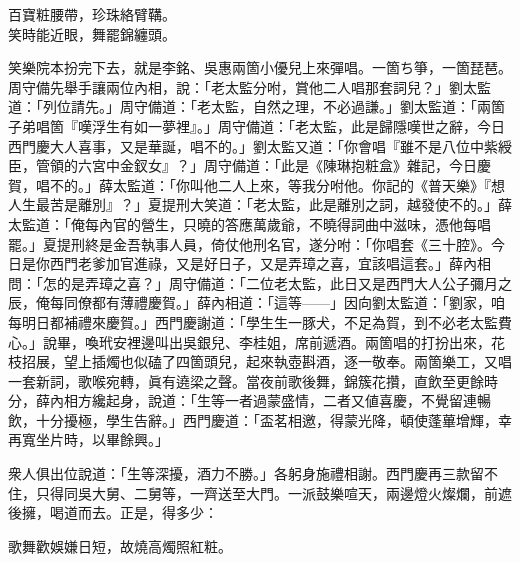 \begin{myquote}
百寶粧腰帶，珍珠絡臂鞲。\\笑時能近眼，舞罷錦纏頭。
\end{myquote}

笑樂院本扮完下去，就是李銘、吳惠兩箇小優兒上來彈唱。一箇ち箏，一箇琵琶。周守備先舉手讓兩位內相，說：「老太監分咐，賞他二人唱那套詞兒？」劉太監道：「列位請先。」周守備道：「老太監，自然之理，不必過謙。」劉太監道：「兩箇子弟唱箇『嘆浮生有如一夢裡』。」{}周守備道：「老太監，此是歸隱嘆世之辭，今日西門慶大人喜事，又是華誕，唱不的。」劉太監又道：「你會唱『雖不是八位中紫綬臣，管領的六宮中金釵女』？」{}周守備道：「此是《陳琳抱粧盒》雜記，今日慶賀，唱不的。」薛太監道：「你叫他二人上來，等我分咐他。你記的《普天樂》『想人生最苦是離別』？」{}夏提刑大笑道：「老太監，此是離別之詞，越發使不的。」薛太監道：「俺每內官的營生，只曉的答應萬歲爺，不曉得詞曲中滋味，憑他每唱罷。」{}夏提刑終是金吾執事人員，倚仗他刑名官，遂分咐：「你唱套《三十腔》。今日是你西門老爹加官進祿，又是好日子，又是弄璋之喜，宜該唱這套。」薛內相問：「怎的是弄璋之喜？」{}周守備道：「二位老太監，此日又是西門大人公子彌月之辰，俺每同僚都有薄禮慶賀。」薛內相道：「這等——」因向劉太監道：「劉家，咱每明日都補禮來慶賀。」西門慶謝道：「學生生一豚犬，不足為賀，到不必老太監費心。」說畢，喚玳安裡邊叫出吳銀兒、李桂姐，席前遞酒。兩箇唱的打扮出來，花枝招展，望上插燭也似磕了四箇頭兒，起來執壺斟酒，逐一敬奉。兩箇樂工，又唱一套新詞，歌喉宛轉，眞有遶梁之聲。當夜前歌後舞，錦簇花攢，直飲至更餘時分，薛內相方纔起身，說道：「生等一者過蒙盛情，二者又値喜慶，不覺留連暢飲，十分擾極，學生告辭。」西門慶道：「盃茗相邀，得蒙光降，頓使蓬蓽增輝，幸再寬坐片時，以畢餘興。」

衆人俱出位說道：「生等深擾，酒力不勝。」各躬身施禮相謝。西門慶再三款留不住，只得同吳大舅、二舅等，一齊送至大門。一派鼓樂喧天，兩邊燈火燦爛，前遮後擁，喝道而去。正是，得多少：

\begin{myquote}
歌舞歡娛嫌日短，故燒高燭照紅粧。
\end{myquote}

